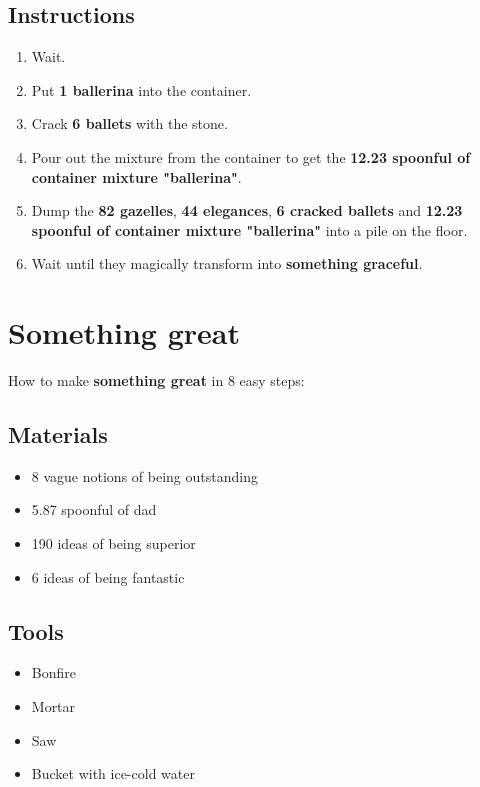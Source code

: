\documentclass{article}
\begin{document}
\subsection{Instructions}\begin{enumerate}
\item 
Wait.
\item 
Put \textbf{1 ballerina} into the container.
\item 
Crack \textbf{6 ballets} with the stone.
\item 
Pour out the mixture from the container to get the \textbf{12.23 spoonful of container mixture "ballerina"}.
\item 
Dump the \textbf{82 gazelles}, \textbf{44 elegances}, \textbf{6 cracked ballets} and \textbf{12.23 spoonful of container mixture "ballerina"} into a pile on the floor.
\item 
Wait until they magically transform into \textbf{something graceful}.
\end{enumerate}
\newpage
\section{Something great}How to make \textbf{something great} in 8 easy steps:

\subsection{Materials}\begin{itemize}
\item 
8 vague notions of being outstanding
\item 
5.87 spoonful of dad
\item 
190 ideas of being superior
\item 
6 ideas of being fantastic
\end{itemize}
\subsection{Tools}\begin{itemize}
\item 
Bonfire
\item 
Mortar
\item 
Saw
\item 
Bucket with ice-cold water
\end{itemize}
\end{document}
